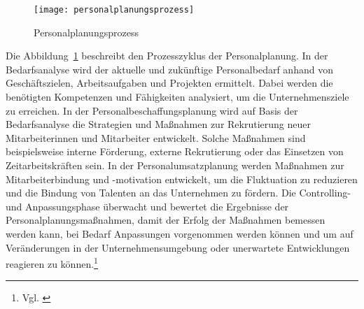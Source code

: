 \begin{figure}%
\centering
\texttt{[image: personalplanungsprozess]}
\caption{Personalplanungsprozess}
\label{fig:personalplanungsprozess}
\end{figure}

Die Abbildung~\ref{fig:personalplanungsprozess} beschreibt den Prozesszyklus der Personalplanung. In der Bedarfsanalyse wird der aktuelle und zukünftige Personalbedarf anhand von Geschäftszielen, Arbeitsaufgaben und Projekten ermittelt. Dabei werden die benötigten Kompetenzen und Fähigkeiten analysiert, um die Unternehmensziele zu erreichen. In der Personalbeschaffungsplanung wird auf Basis der Bedarfsanalyse die Strategien und Maßnahmen zur Rekrutierung neuer Mitarbeiterinnen und Mitarbeiter entwickelt. Solche Maßnahmen sind beispielsweise interne Förderung, externe Rekrutierung oder das Einsetzen von Zeitarbeitskräften sein. In der Personalumsatzplanung werden Maßnahmen zur Mitarbeiterbindung und -motivation entwickelt, um die Fluktuation zu reduzieren und die Bindung von Talenten an das Unternehmen zu fördern. Die Controlling- und Anpassungsphase überwacht und bewertet die Ergebnisse der Personalplanungsmaßnahmen, damit der Erfolg der Maßnahmen bemessen werden kann, bei Bedarf Anpassungen vorgenommen werden können und um auf Veränderungen in der Unternehmensumgebung oder unerwartete Entwicklungen reagieren zu können.\footnote{Vgl. \cite{bwllexikon2024}}


